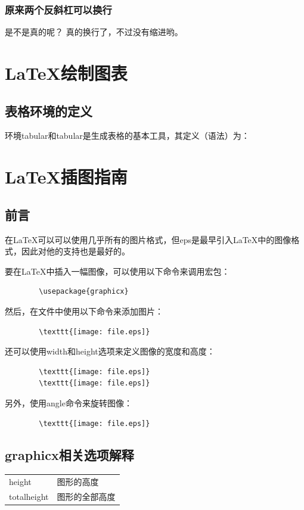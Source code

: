 \documentclass[12pt, a4paper,openany]{book}%
\begin{document}
\fancyhf{}
	\pagestyle{fancy}
\subsection{原来两个反斜杠可以换行}
是不是真的呢？
真的换行了，不过没有缩进哟。

\chapter{\LaTeX{}绘制图表}
\section{表格环境的定义}
环境tabular和tabular是生成表格的基本工具，其定义（语法）为：


\chapter{\LaTeX{}插图指南}

\section{前言}
在\LaTeX{}可以可以使用几乎所有的图片格式，但eps是最早引入\LaTeX{}中的图像格式，因此对他的支持也是最好的。

要在\LaTeX{}中插入一幅图像，可以使用以下命令来调用宏包：
	\begin{lstlisting}
		\usepackage{graphicx}
	\end{lstlisting}

然后，在文件中使用以下命令来添加图片：
	\begin{lstlisting}
		\texttt{[image: file.eps]}
	\end{lstlisting}

还可以使用width和height选项来定义图像的宽度和高度：
	\begin{lstlisting}
		\texttt{[image: file.eps]}
		\texttt{[image: file.eps]}
	\end{lstlisting}

另外，使用angle命令来旋转图像：
	\begin{lstlisting}
		\texttt{[image: file.eps]}
	\end{lstlisting}

\section{graphicx相关选项解释}
	\begin{tabular}{ll}
		height & 图形的高度 \\
		totalheight & 图形的全部高度 \\
	\end{tabular}
\end{document}
